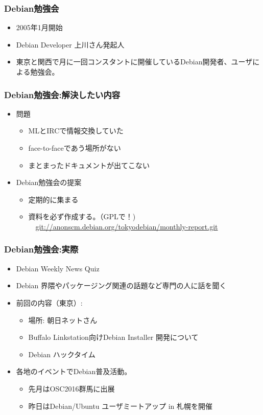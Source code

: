 \begin{frame}
\frametitle{Debian勉強会}
\begin{itemize}
 \item 2005年1月開始
 \item Debian Developer 上川さん発起人
\item 東京と関西で月に一回コンスタントに開催しているDebian開発者、ユーザによる勉強会。
\end{itemize}
\end{frame}

\begin{frame}

\frametitle{Debian勉強会:解決したい内容}
\begin{itemize}
 \item<1-> 問題
       \begin{itemize}
	\item MLとIRCで情報交換していた
	\item face-to-faceであう場所がない
	\item まとまったドキュメントが出てこない
       \end{itemize}
 \item<2-> Debian勉強会の提案
       \begin{itemize}
	\item 定期的に集まる
	\item 資料を必ず作成する。（GPLで！)
	  \ \ {\small \url{git://anonscm.debian.org/tokyodebian/monthly-report.git}}
       \end{itemize}
\end{itemize}

\end{frame}

\begin{frame}
 \frametitle{Debian勉強会:実際}
 \begin{itemize}
  \item Debian Weekly News Quiz
  \item Debian 界隈やパッケージング関連の話題など専門の人に話を聞く
  \item 前回の内容（東京）:\\
	\begin{itemize}
	\item 場所: 朝日ネットさん
	\item Buffalo Linkstation向けDebian Installer 開発について
	\item Debian ハックタイム
	\end{itemize}
  \item 各地のイベントでDebian普及活動。 
	\begin{itemize}
	  \item 先月はOSC2016群馬に出展
	  \item 昨日はDebian/Ubuntu ユーザミートアップ in 札幌を開催
	\end{itemize}
 \end{itemize}
\end{frame}

